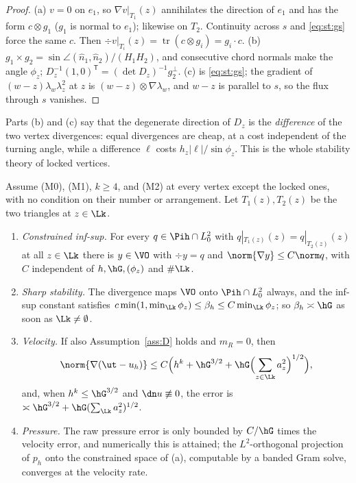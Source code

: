 \begin{proof}
(a) $v=0$ on $e_1$, so $\nabla v|_{T_1}(z)$ annihilates the direction of $e_1$ and has the form $c\otimes g_1$ ($g_1$ is normal to $e_1$); likewise on $T_2$. Continuity across $s$ and \eqref{eq:st:gs} force the same $c$. Then $\div v|_{T_i}(z)=\operatorname{tr}(c\otimes g_i)=g_i\cdot c$. (b) $g_1\times g_2=\sin\angle(\hat n_1,\hat n_2)/(H_1H_2)$, and consecutive chord normals make the angle $\phi_z$; $D_z^{-1}(1,0)^{\mathsf T}=(\det D_z)^{-1}g_2^\perp$. (c) is \eqref{eq:st:gs}; the gradient of $(w-z)\lambda_w\lambda_z^2$ at $z$ is $(w-z)\otimes\nabla\lambda_w$, and $w-z$ is parallel to $s$, so the flux through $s$ vanishes.
\end{proof}

Parts (b) and (c) say that the degenerate direction of $D_z$ is the \emph{difference} of the two vertex divergences: equal divergences are cheap, at a cost independent of the turning angle, while a difference $\ell$ costs $h_z|\ell|/\sin\phi_z$. This is the whole stability theory of locked vertices.

\begin{theorem}\label{thm:st:locks}
Assume (M0), (M1), $k\ge4$, and (M2) at every vertex except the locked ones, with no condition on their number or arrangement. Let $T_1(z),T_2(z)$ be the two triangles at $z\in\Lk$.
\begin{enumerate}[label=(\alph*)]
\item \emph{Constrained inf-sup.} For every $q\in\Pih\cap L^2_0$ with $q|_{T_1(z)}(z)=q|_{T_2(z)}(z)$ at all $z\in\Lk$ there is $y\in\VO$ with $\div y=q$ and $\norm{\nabla y}\le C\norm q$, with $C$ independent of $h,\hG,(\phi_z)$ and $\#\Lk$.
\item \emph{Sharp stability.} The divergence maps $\VO$ onto $\Pih\cap L^2_0$ always, and the inf-sup constant satisfies $c\min(1,\min_{\Lk}\phi_z)\le\beta_h\le C\min_{\Lk}\phi_z$; so $\beta_h\asymp\hG$ as soon as $\Lk\ne\emptyset$.
\item \emph{Velocity.} If also Assumption~\ref{ass:D} holds and $m_R=0$, then
\[
\norm{\nabla(\ut-u_h)}\le C\Bigl(h^k+\hG^{3/2}+\hG\Bigl(\sum_{z\in\Lk}a_z^2\Bigr)^{1/2}\Bigr),
\]
and, when $h^k\le\hG^{3/2}$ and $\dn u\not\equiv0$, the error is $\asymp\hG^{3/2}+\hG(\sum_{\Lk}a_z^2)^{1/2}$.
\item \emph{Pressure.} The raw pressure error is only bounded by $C/\hG$ times the velocity error, and numerically this is attained; the $L^2$-orthogonal projection of $p_h$ onto the constrained space of (a), computable by a banded Gram solve, converges at the velocity rate.
\end{enumerate}
\end{theorem}


